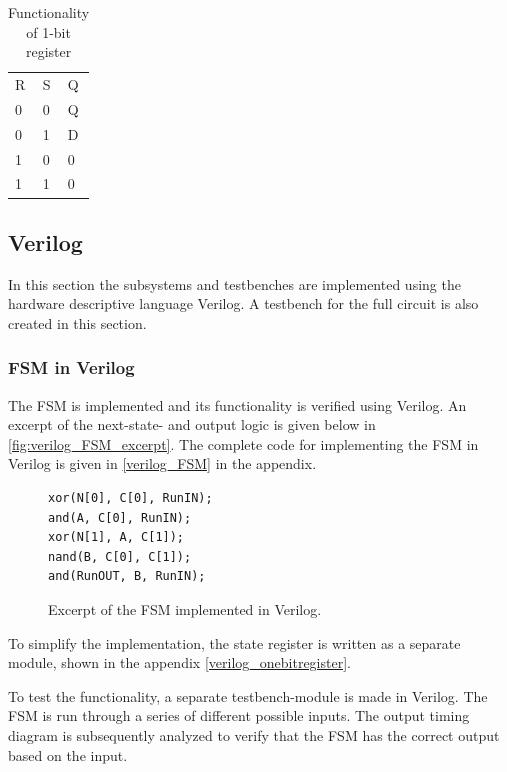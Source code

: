 \begin{table}[H]
\centering
\caption{Functionality of 1-bit register}
\label{tab:registerFunc}
\begin{tabular}{|l|l|l|}
\cline{1-3}
\rowcolor[HTML]{C0C0C0} 
R & S & Q  \\ \cline{1-3}
0 & 0 & Q  \\ \cline{1-3}
0 & 1 & D  \\ \cline{1-3}
1 & 0 & 0  \\ \cline{1-3}
1 & 1 & 0  \\ \cline{1-3}
\end{tabular}
\end{table}


\subsection{Verilog}

In this section the subsystems and testbenches are implemented using the hardware descriptive language Verilog. A testbench for the full circuit is also created in this section.

\subsubsection{FSM in Verilog}
\label{subsec:fsm_verilog}

The FSM is implemented and its functionality is verified using Verilog. An excerpt of the next-state- and output logic is given below in \autoref{fig:verilog_FSM_excerpt}. The complete code for implementing the FSM in Verilog is given in \autoref{verilog_FSM} in the appendix.


\begin{figure}[H]
\centering
\begin{minipage}{0.33\textwidth}
\begin{lstlisting}[style=verilogStyle]
xor(N[0], C[0], RunIN);
and(A, C[0], RunIN);
xor(N[1], A, C[1]);
nand(B, C[0], C[1]);
and(RunOUT, B, RunIN);
\end{lstlisting}
\end{minipage}
\caption{Excerpt of the FSM implemented in Verilog.}
\label{fig:verilog_FSM_excerpt}
\end{figure}


To simplify the implementation, the state register is written as a separate module, shown in the appendix \autoref{verilog_onebitregister}.

To test the functionality, a separate testbench-module is made in Verilog. The FSM is run through a series of different possible inputs. The output timing diagram is subsequently analyzed to verify that the FSM has the correct output based on the input.

